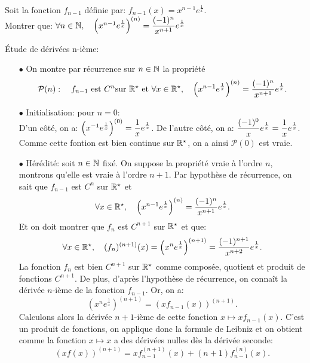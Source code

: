 \documentclass[a4paper, 11pt,reqno]{article}
\begin{document}
\begin{exercice}
	Soit la fonction $f_{n-1}$ d\'efinie par: $f_{n-1}(x)=x^{n-1}e^{\frac{1}{x}}$.\\
	\noindent Montrer que: $\forall n\in\mathbb{N},\quad \left( x^{n-1}e^{\frac{1}{x}} \right)^{(n)}=\displaystyle\frac{(-1)^n}{x^{n+1}}e^{\frac{1}{x}}$
\end{exercice}
\begin{correction}
	\'Etude de d\'eriv\'ees n-i\`eme:
	\begin{itemize}
		\item[$\bullet$] On montre par r\'ecurrence sur $n\in\mathbb{N}$ la propri\'et\'e
		      $$\mathcal{P}(n):\quad f_{n-1}\ \hbox{est}\ C^n\hbox{sur}\ \R^{\star}\ \hbox{et}\ \forall x\in\R^{\star},\quad \left( x^{n-1}e^{\frac{1}{x}} \right)^{(n)}=\ddp\frac{(-1)^n}{x^{n+1}}e^{\frac{1}{x}}.$$
		\item[$\bullet$] Initialisation: pour $n=0$:\\
		      \noindent D'un c\^ot\'e, on a: $\left( x^{-1} e^{\frac{1}{x}}\right)^{(0)}=\displaystyle\frac{1}{x}e^{\frac{1}{x}}$. De l'autre c\^ot\'e, on a:
		      $\displaystyle\frac{(-1)^0 }{x}e^{\frac{1}{x}}=\displaystyle\frac{1}{x}e^{\frac{1}{x}}$. Comme cette fontion est bien continue sur $\mathbb{R}^{\star}$, on a ainsi $\mathcal{P}(0)$ est vraie.
		\item[$\bullet$] H\'er\'edit\'e: soit $n\in\mathbb{N}$ fix\'e. On suppose la propri\'et\'e vraie \`a l'ordre $n$, montrons qu'elle est vraie \`a l'ordre $n+1$. Par hypoth\`ese de r\'ecurrence, on sait que $f_{n-1}$ est $C^n$ sur $\mathbb{R}^{\star}$ et
		      $$\forall x\in\mathbb{R}^{\star},\quad \left( x^{n-1}e^{\frac{1}{x}} \right)^{(n)}=\displaystyle\frac{(-1)^n}{x^{n+1}}e^{\frac{1}{x}}.$$
		      Et on doit montrer que $f_n$ est $C^{n+1}$ sur $\mathbb{R}^{\star}$ et que:
		      $$\forall x\in\mathbb{R}^{\star},\quad (f_n)^{(n+1)}(x)=\left( x^{n}e^{\frac{1}{x}} \right)^{(n+1)}=\displaystyle\frac{(-1)^{n+1}}{x^{n+2}}e^{\frac{1}{x}}.$$
		      La fonction $f_{n}$ est bien $C^{n+1}$ sur $\mathbb{R}^{\star}$ comme compos\'ee, quotient et produit de fonctions $C^{n+1}$. De plus, d'apr\`es l'hypoth\`ese de r\'ecurrence, on conna\^it la d\'eriv\'ee $n$-i\`eme de la fonction $f_{n-1}$. Or, on a:
		      $$\left( x^{n}e^{\frac{1}{x}} \right)^{(n+1)}=\left( xf_{n-1}(x) \right)^{(n+1)}.$$
		      Calculons alors la d\'eriv\'ee $n+1$-i\`eme de cette fonction $x\mapsto xf_{n-1}(x)$. C'est un produit de fonctions, on applique donc la formule de Leibniz et on obtient comme la fonction $x\mapsto x$ a des d\'eriv\'ees nulles d\`es la d\'eriv\'ee seconde:
		      $$\left( xf(x) \right)^{(n+1)}=xf_{n-1}^{(n+1)}(x)+(n+1)f_{n-1}^{(n)}(x).$$

\end{itemize}
\end{correction}
\end{document}
